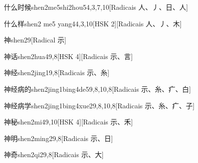 \begin{entry}{什么时候}{shen2me5shi2hou5}{4,3,7,10}[Radicais ⼈、⼃、⽇、⼈]
\end{entry}

\begin{entry}{什么样}{shen2 me5 yang4}{4,3,10}[HSK 2][Radicais ⼈、⼃、⽊]
\end{entry}

\begin{entry}{神}{shen2}{9}[Radical ⽰]
\end{entry}

\begin{entry}{神话}{shen2hua4}{9,8}[HSK 4][Radicais ⽰、⾔]
\end{entry}

\begin{entry}{神经}{shen2jing1}{9,8}[Radicais ⽰、⽷]
\end{entry}

\begin{entry}{神经病的}{shen2jing1bing4de5}{9,8,10,8}[Radicais ⽰、⽷、⽧、⽩]
\end{entry}

\begin{entry}{神经病学}{shen2jing1bing4xue2}{9,8,10,8}[Radicais ⽰、⽷、⽧、⼦]
\end{entry}

\begin{entry}{神秘}{shen2mi4}{9,10}[HSK 4][Radicais ⽰、⽲]
\end{entry}

\begin{entry}{神明}{shen2ming2}{9,8}[Radicais ⽰、⽇]
\end{entry}

\begin{entry}{神奇}{shen2qi2}{9,8}[Radicais ⽰、⼤]
\end{entry}


